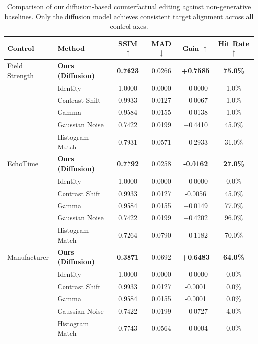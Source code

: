 \begin{table}[t]
\centering
\caption{Comparison of our diffusion-based counterfactual editing against non-generative baselines. Only the diffusion model achieves consistent target alignment across all control axes.}
\label{tab:baseline_comparison}
\small
\begin{tabular}{llcccc}
\toprule
Control & Method & SSIM $\uparrow$ & MAD $\downarrow$ & Gain $\uparrow$ & Hit Rate $\uparrow$ \\
\midrule
Field Strength & \textbf{Ours (Diffusion)} & \textbf{0.7623} & 0.0266 & \textbf{+0.7585} & \textbf{75.0\%} \\
 & Identity & 1.0000 & 0.0000 & +0.0000 & 1.0\% \\
 & Contrast Shift & 0.9933 & 0.0127 & +0.0067 & 1.0\% \\
 & Gamma & 0.9584 & 0.0155 & +0.0138 & 1.0\% \\
 & Gaussian Noise & 0.7422 & 0.0199 & +0.4410 & 45.0\% \\
 & Histogram Match & 0.7931 & 0.0571 & +0.2933 & 31.0\% \\
\midrule
EchoTime & \textbf{Ours (Diffusion)} & \textbf{0.7792} & 0.0258 & \textbf{-0.0162} & \textbf{27.0\%} \\
 & Identity & 1.0000 & 0.0000 & +0.0000 & 0.0\% \\
 & Contrast Shift & 0.9933 & 0.0127 & -0.0056 & 45.0\% \\
 & Gamma & 0.9584 & 0.0155 & +0.0149 & 77.0\% \\
 & Gaussian Noise & 0.7422 & 0.0199 & +0.4202 & 96.0\% \\
 & Histogram Match & 0.7264 & 0.0790 & +0.1182 & 70.0\% \\
\midrule
Manufacturer & \textbf{Ours (Diffusion)} & \textbf{0.3871} & 0.0692 & \textbf{+0.6483} & \textbf{64.0\%} \\
 & Identity & 1.0000 & 0.0000 & +0.0000 & 0.0\% \\
 & Contrast Shift & 0.9933 & 0.0127 & -0.0001 & 0.0\% \\
 & Gamma & 0.9584 & 0.0155 & -0.0001 & 0.0\% \\
 & Gaussian Noise & 0.7422 & 0.0199 & +0.0727 & 4.0\% \\
 & Histogram Match & 0.7743 & 0.0564 & +0.0004 & 0.0\% \\
\bottomrule
\end{tabular}
\end{table}